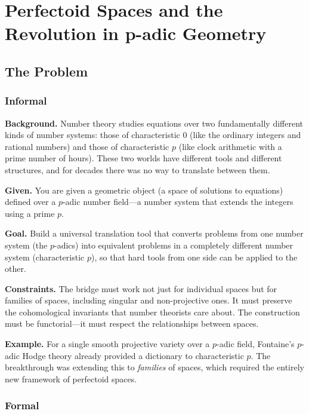 \let\LocalMacro\relax

\chapter{Perfectoid Spaces and the Revolution in p-adic Geometry}

\section{The Problem}

\subsection{Informal}

\textbf{Background.} Number theory studies equations over two fundamentally different kinds of number systems: those of characteristic 0 (like the ordinary integers and rational numbers) and those of characteristic $p$ (like clock arithmetic with a prime number of hours). These two worlds have different tools and different structures, and for decades there was no way to translate between them.

\textbf{Given.} You are given a geometric object (a space of solutions to equations) defined over a $p$-adic number field---a number system that extends the integers using a prime $p$.

\textbf{Goal.} Build a universal translation tool that converts problems from one number system (the $p$-adics) into equivalent problems in a completely different number system (characteristic $p$), so that hard tools from one side can be applied to the other.

\textbf{Constraints.} The bridge must work not just for individual spaces but for families of spaces, including singular and non-projective ones. It must preserve the cohomological invariants that number theorists care about. The construction must be functorial---it must respect the relationships between spaces.

\textbf{Example.} For a single smooth projective variety over a $p$-adic field, Fontaine's $p$-adic Hodge theory already provided a dictionary to characteristic $p$. The breakthrough was extending this to \emph{families} of spaces, which required the entirely new framework of perfectoid spaces.

\subsection{Formal}

